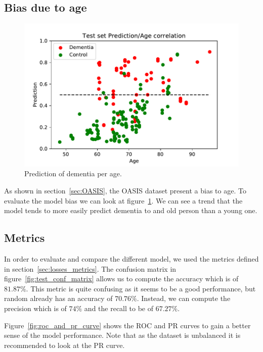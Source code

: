 \subsection{Bias due to age}
\begin{figure}
 \centering
 \includegraphics[width=.9\linewidth]{figures/Experiements/Eval/prediction_age.pdf}
 \captionsetup{width=.9\linewidth}
 \caption[PredPerAge]{Prediction of dementia per age.}
 \label{fig:prediction_per_age}
\end{figure}
As shown in section~\ref{sec:OASIS}, the OASIS dataset present a bias to age. To evaluate the model bias we can look at figure~\ref{fig:prediction_per_age}. We can see a trend that the model tends to more easily predict dementia to and old person than a young one.


\subsection{Metrics}
In order to evaluate and compare the different model, we used the metrics defined in section~\ref{sec:losses_metrics}. The confusion matrix in figure~\ref{fig:test_conf_matrix} allows us to compute the accuracy which is of $81.87\%$. This metric is quite confusing as it seems to be a good performance, but random already has an accuracy of $70.76\%$. Instead, we can compute the precision which is of $74\%$ and the recall to be of $67.27\%$.

Figure~\ref{fig:roc_and_pr_curve} shows the ROC and PR curves to gain a better sense of the model performance. Note that as the dataset is unbalanced it is recommended to look at the PR curve. 

